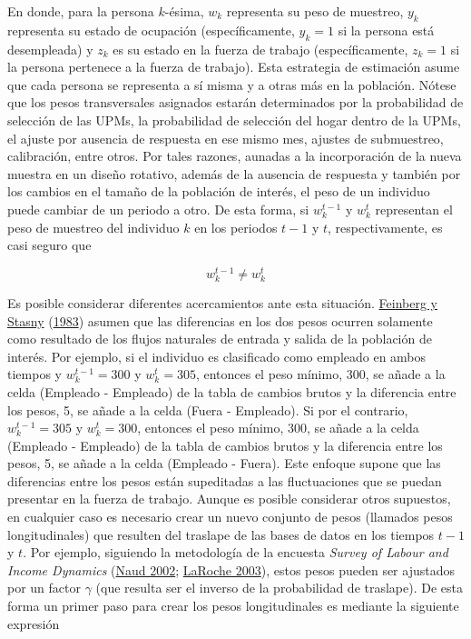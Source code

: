 \documentclass[
  12pt,
  spanish,
]{book}
\begin{document}
En donde, para la persona \(k\)-ésima, \(w_k\) representa su peso de muestreo, \(y_k\) representa su estado de ocupación (específicamente, \(y_k=1\) si la persona está desempleada) y \(z_k\) es su estado en la fuerza de trabajo (específicamente, \(z_k=1\) si la persona pertenece a la fuerza de trabajo). Esta estrategia de estimación asume que cada persona se representa a sí misma y a otras más en la población. Nótese que los pesos transversales asignados estarán determinados por la probabilidad de selección de las UPMs, la probabilidad de selección del hogar dentro de la UPMs, el ajuste por ausencia de respuesta en ese mismo mes, ajustes de submuestreo, calibración, entre otros. Por tales razones, aunadas a la incorporación de la nueva muestra en un diseño rotativo, además de la ausencia de respuesta y también por los cambios en el tamaño de la población de interés, el peso de un individuo puede cambiar de un periodo a otro. De esta forma, si \(w_k^{t-1}\) y \(w_k^{t}\) representan el peso de muestreo del individuo \(k\) en los periodos \(t-1\) y \(t\), respectivamente, es casi seguro que

\[w_k^{t-1} \neq w_k^t\]

Es posible considerar diferentes acercamientos ante esta situación. \protect\hyperlink{ref-Feinberg_Stasny_1983}{Feinberg y Stasny} (\protect\hyperlink{ref-Feinberg_Stasny_1983}{1983}) asumen que las diferencias en los dos pesos ocurren solamente como resultado de los flujos naturales de entrada y salida de la población de interés. Por ejemplo, si el individuo es clasificado como empleado en ambos tiempos y \(w_k^{t-1}=300\) y \(w_k^{t}=305\), entonces el peso mínimo, 300, se añade a la celda (Empleado - Empleado) de la tabla de cambios brutos y la diferencia entre los pesos, 5, se añade a la celda (Fuera - Empleado). Si por el contrario, \(w_k^{t-1}=305\) y \(w_k^{t}=300\), entonces el peso mínimo, 300, se añade a la celda (Empleado - Empleado) de la tabla de cambios brutos y la diferencia entre los pesos, 5, se añade a la celda (Empleado - Fuera). Este enfoque supone que las diferencias entre los pesos están supeditadas a las fluctuaciones que se puedan presentar en la fuerza de trabajo. Aunque es posible considerar otros supuestos, en cualquier caso es necesario crear un nuevo conjunto de pesos (llamados pesos longitudinales) que resulten del traslape de las bases de datos en los tiempos \(t-1\) y \(t\). Por ejemplo, siguiendo la metodología de la encuesta \emph{Survey of Labour and Income Dynamics} (\protect\hyperlink{ref-Naud_2002}{Naud 2002}; \protect\hyperlink{ref-LaRoche_2003}{LaRoche 2003}), estos pesos pueden ser ajustados por un factor \(\gamma\) (que resulta ser el inverso de la probabilidad de traslape). De esta forma un primer paso para crear los pesos longitudinales es mediante la siguiente expresión
\end{document}
